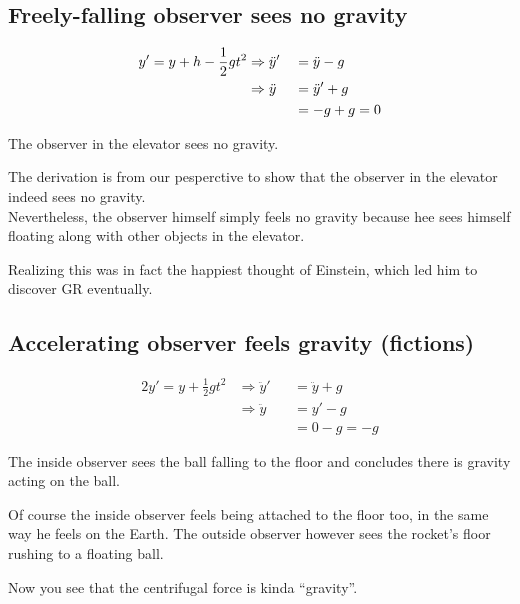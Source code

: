 \documentclass[11pt,fleqn]{book} %
\begin{document}
\subsection{Freely-falling observer sees no gravity}
\begin{figure}[h]
\centering
\end{figure}
\begin{alignat*}{2}
  y' = y + h - \frac{1}{2}gt^2 &\Rightarrow \ddot{y}' &&= \ddot{y} - g \hfill  \\
                               &\Rightarrow \ddot{y}  &&= \ddot{y}' + g \hfill \\
                               &\                     &&= -g + g = 0 \hfill
\end{alignat*}
\begin{emphbox}
  The observer in the elevator sees no gravity.
\end{emphbox}
\begin{remark}
  The derivation is from our pesperctive to show that the observer in the
  elevator indeed sees no gravity. \\
  Nevertheless, the observer himself simply feels no gravity because hee sees
  himself floating along with other objects in the elevator.
\end{remark}
Realizing this was in fact the happiest thought of Einstein, which led him to
discover GR eventually.

\subsection{Accelerating observer feels gravity (fictions)}
\begin{figure}[h]
\centering
\end{figure}
\begin{alignat*}{2}
  y' = y + \frac{1}{2}gt^2 & \Rightarrow \ddot{y}' && = \ddot{y} + g \\
                           & \Rightarrow \ddot{y}  && = y' -g        \\
                           & \                     && = 0-g = -g
\end{alignat*}
\begin{emphbox}
  The inside observer sees the ball falling to the floor and concludes there is
  gravity acting on the ball.
\end{emphbox}
\begin{remark}
  Of course the inside observer feels being attached to the floor too, in the
  same way he feels on the Earth.
  The outside observer however sees the rocket's floor rushing to a floating ball.
\end{remark}
  Now you see that the centrifugal force is kinda ``gravity''.
\end{document}

